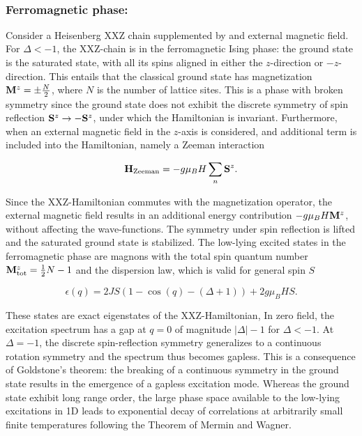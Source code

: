 \documentclass{homework}
\begin{document}
\blanky \\

\subsubsection{\textbf{Ferromagnetic phase: }}

Consider a Heisenberg XXZ chain supplemented by and external magnetic field. For $\Delta < -1$, the XXZ-chain is in the ferromagnetic Ising phase: the ground state is the saturated state, with all its spins aligned in either the $z$-direction or $-z$-direction. This entails that the classical ground state has magnetization ${\bf M}^z = \pm \frac{N}{2}$, where $N$ is the number of lattice sites. This is a phase with broken symmetry since the ground state does not exhibit the discrete symmetry of spin reflection ${\bf S}^z \rightarrow -{\bf S}^z$, under which the Hamiltonian is invariant. Furthermore, when an external magnetic field in the $z$-axis is considered, and additional term is included into the Hamiltonian, namely a Zeeman interaction 

$$
    {\bf H}_{\textnormal{Zeeman}} = - g \mu_B H \sum_{n} {\bf S}^z.
$$

Since the XXZ-Hamiltonian commutes with the magnetization operator, the external magnetic field results in an additional energy contribution $-g \mu_B H {\bf M}^z$, without affecting the wave-functions. The symmetry under spin reflection is lifted and the saturated ground state is stabilized. The low-lying excited states in the ferromagnetic phase are magnons with the total spin quantum number ${\bf M}^z_{\textnormal{tot}} = \frac{1}{2} N - 1$ and the dispersion law, which is valid for general spin $S$

\begin{equation}
    \epsilon(q) = 2 J S (1-\cos(q) - (\Delta + 1)) + 2g \mu_B H S. 
    \label{XXZ-spectrum}
\end{equation}

These states are exact eigenstates of the XXZ-Hamiltonian, In zero field, the excitation spectrum has a gap at $q=0$ of magnitude $|\Delta| - 1$ for $\Delta < -1$. At $\Delta = -1$, the discrete spin-reflection symmetry generalizes to a continuous rotation symmetry and the spectrum thus becomes gapless. This is a consequence of Goldstone's theorem: the breaking of a continuous symmetry in the ground state results in the emergence of a gapless excitation mode. Whereas the ground state exhibit long range order, the large phase space available to the low-lying excitations in 1D leads to exponential decay of correlations at arbitrarily small finite temperatures following the Theorem of Mermin and Wagner. \\
\end{document}

